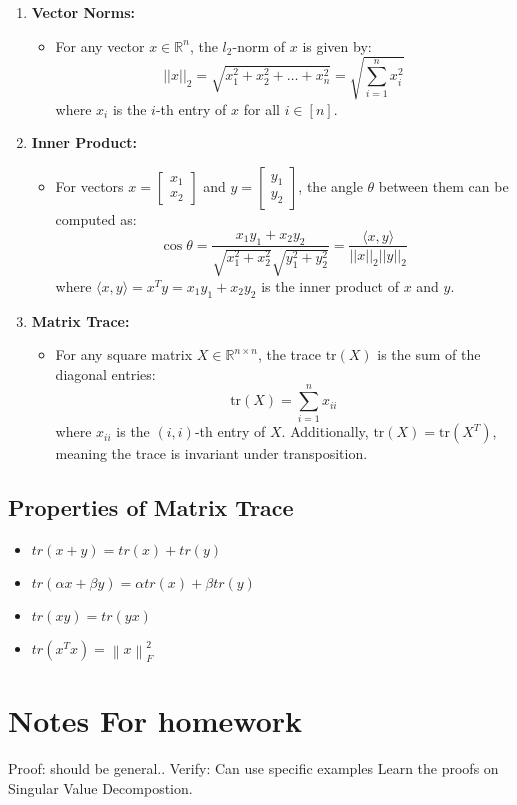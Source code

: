 \documentclass{article}
\begin{document}
\begin{enumerate}
    \item \textbf{Vector Norms:}
    \begin{itemize}
        \item For any vector \( x \in \mathbb{R}^n \), the \( l_2 \)-norm of \( x \) is given by:
        \[
        ||x||_2 = \sqrt{x_1^2 + x_2^2 + \dots + x_n^2} = \sqrt{\sum_{i=1}^{n} x_i^2}
        \]
        where \( x_i \) is the \( i \)-th entry of \( x \) for all \( i \in [n] \).
    \end{itemize}

    \item \textbf{Inner Product:}
    \begin{itemize}
        \item For vectors \( x = \begin{bmatrix} x_1 \\ x_2 \end{bmatrix} \) and \( y = \begin{bmatrix} y_1 \\ y_2 \end{bmatrix} \), the angle \( \theta \) between them can be computed as:
        \[
        \cos{\theta} = \frac{x_1 y_1 + x_2 y_2}{\sqrt{x_1^2 + x_2^2} \sqrt{y_1^2 + y_2^2}} 
        = \frac{\langle x, y \rangle}{||x||_2 ||y||_2}
        \]
        where \( \langle x, y \rangle = x^T y = x_1 y_1 + x_2 y_2 \) is the inner product of \( x \) and \( y \).
    \end{itemize}

    \item \textbf{Matrix Trace:}
    \begin{itemize}
        \item For any square matrix \( X \in \mathbb{R}^{n \times n} \), the trace \( \text{tr}(X) \) is the sum of the diagonal entries:
        \[
        \text{tr}(X) = \sum_{i=1}^{n} x_{ii}
        \]
        where \( x_{ii} \) is the \( (i,i) \)-th entry of \( X \). 
        Additionally, \( \text{tr}(X) = \text{tr}(X^T) \), meaning the trace is invariant under transposition.
    \end{itemize}
\end{enumerate}
\subsection{Properties of Matrix Trace}
\begin{itemize}
    \item \(tr(x+y) = tr(x) + tr(y)\)
    \item \(tr(\alpha x+ \beta y) = \alpha tr(x) + \beta tr(y)\)
    \item \(tr(xy) = tr(yx)\)
    \item \(tr(x^Tx) = \left\lVert x \right\rVert^2_F \)
\end{itemize}
\section{ Notes For homework}
Proof: should be general..
Verify: Can use specific examples 
Learn the proofs on Singular Value Decompostion.
\end{document}
